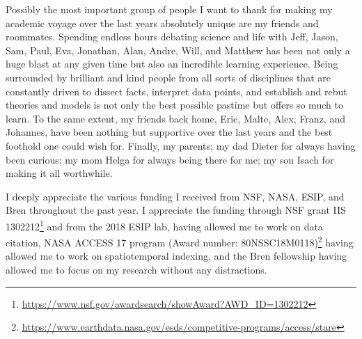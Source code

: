 \begin{acknowledgements}
Possibly the most important group of people I want to thank for making my academic voyage over the last years absolutely unique are my friends and roommates. Spending endless hours debating science and life with Jeff, Jason, Sam, Paul, Eva, Jonathan, Alan, Andre, Will, and Matthew has been not only a huge blast at any given time but also an incredible learning experience. Being surrounded by brilliant and kind people from all sorts of disciplines that are constantly driven to dissect facts, interpret data points, and establish and rebut theories and models is not only the best possible pastime but offers so much to learn.
To the same extent, my friends back home, Eric, Malte, Alex, Franz, and Johannes, have been nothing but supportive over the last years and the best foothold one could wish for. Finally, my parents; my dad Dieter for always having been curious; my mom Helga for always being there for me; my son Isach for making it all worthwhile.

I deeply appreciate the various funding I received from NSF, NASA, ESIP, and Bren throughout the past year. I appreciate the funding through NSF grant IIS 1302212\footnote{\url{https://www.nsf.gov/awardsearch/showAward?AWD_ID=1302212}} and from the 2018 ESIP lab, having allowed me to work on data citation, \gls{NASA} \gls{ACCESS} 17 program (Award number: 80NSSC18M0118)\footnote{\url{https://www.earthdata.nasa.gov/esds/competitive-programs/access/stare}} having allowed me to work on spatiotemporal indexing, and the Bren fellowship having allowed me to focus on my research without any distractions.
\end{acknowledgements} 
